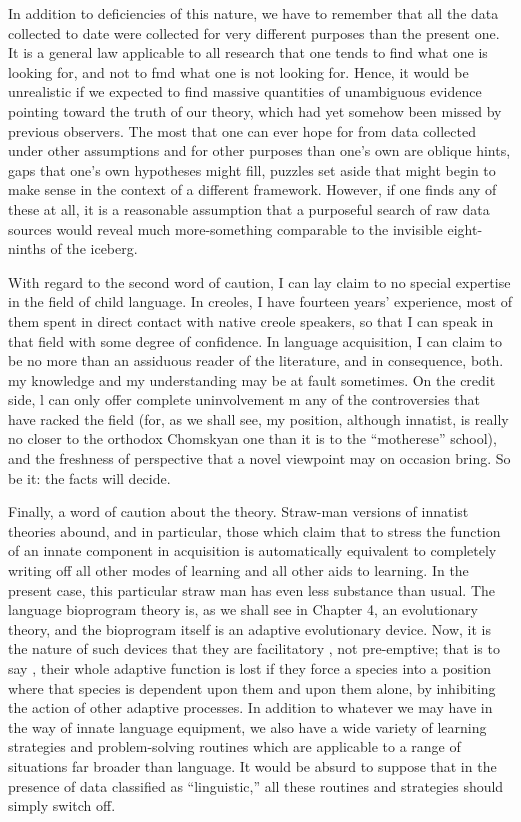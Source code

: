In addition to deficiencies of this nature, we have to remember that all the data collected to date were collected for very different purposes than the present one. It is a general law applicable to all research that one tends to find what one is looking for, and not to fmd what one is not looking for. Hence, it would be unrealistic if we expected to find massive quantities of unambiguous evidence pointing toward the truth of our theory, which had yet somehow been missed by previous observers. The most that one can ever hope for from data collected under other assumptions and for other purposes than one's own are oblique hints, gaps that one's own hypotheses might fill, puzzles set aside that might begin to make sense in the context of a different framework. However, if one finds any of these at all, it is a reasonable assumption that a purposeful search of raw data sources would reveal much more-something comparable to the invisible eight-ninths of the iceberg.

With regard to the second word of caution, I can lay claim to no special expertise in the field of child language. In creoles, I have fourteen years' experience, most of them spent in direct contact with native creole speakers, so that I can speak in that field with some degree of confidence. In language acquisition, I can claim to be no
 more than an assiduous reader of the literature, and in consequence, both. my knowledge and my understanding may be at fault sometimes. On the credit side, l can only offer complete uninvolvement m any of the controversies that have racked the field (for, as we shall see, my position, although innatist, is really no closer to the orthodox Chomskyan one than it is to the ``motherese'' school), and the freshness
of perspective that a novel viewpoint may on occasion bring. So be it: the facts will decide.

Finally, a word of caution about the theory. Straw-man versions
of innatist theories abound, and in particular, those which claim that to stress the function of an innate component in acquisition is auto\-matically equivalent to completely writing off all other modes of learning and all other aids to learning. In the present case, this par\-ticular straw man has even less substance than usual. The language bioprogram theory is, as we shall see in Chapter 4, an evolutionary theory, and the bioprogram itself is an adaptive evolutionary device. Now, it is the nature of such devices that they are facilitatory , not pre-emptive; that is to say , their whole adaptive function is lost if they force a species into a position where that species is dependent upon them and upon them alone, by inhibiting the action of other adaptive processes. In addition to whatever we may have in the way of innate language equipment, we also have a wide variety of learning strategies and problem-solving routines which are applicable to a range of situations far broader than language. It would be absurd to suppose that in the presence of data classified as ``linguistic,'' all these routines and strategies should simply switch off.

